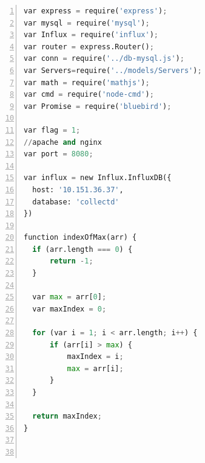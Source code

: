   \begin{lstlisting}[numbers=left, frame=single,tabsize=2,breaklines,caption={Kode sumber Model Auth},label=modelAuth, language=python]
var express = require('express');
var mysql = require('mysql');
var Influx = require('influx');
var router = express.Router();
var conn = require('../db-mysql.js');
var Servers=require('../models/Servers');
var math = require('mathjs');
var cmd = require('node-cmd');
var Promise = require('bluebird'); 

var flag = 1;
//apache and nginx
var port = 8080;

var influx = new Influx.InfluxDB({
  host: '10.151.36.37',
  database: 'collectd'
})

function indexOfMax(arr) {
  if (arr.length === 0) {
      return -1;
  }

  var max = arr[0];
  var maxIndex = 0;

  for (var i = 1; i < arr.length; i++) {
      if (arr[i] > max) {
          maxIndex = i;
          max = arr[i];
      }
  }

  return maxIndex;
}



\end{lstlisting}
